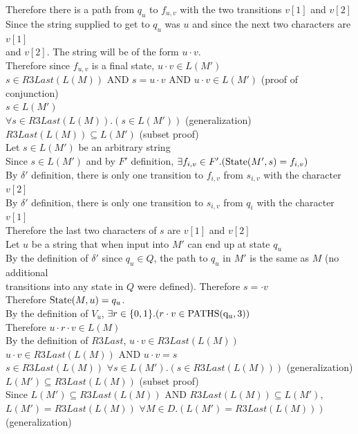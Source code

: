 \documentclass[11pt]{article}
\newcommand{\And}{\mbox{ AND }}
\begin{document}
\begin{enumerate}
\begin{solution}
\null\qquad Therefore there is a path from $q_u$ to $f_{u,v}$ with the two transitions $v[1]$ and $v[2]$\\
\null\qquad Since the string supplied to get to $q_u$ was $u$ and since the next two characters are $v[1]$\\
\null\qquad and $v[2]$. The string will be of the form $u\cdot v$.\\
\null\qquad Therefore since $f_{u,v}$ is a final state, $u\cdot v\in L(M')$\\
\null\qquad $s\in R3Last(L(M)) \And s = u\cdot v\And u\cdot v \in L(M')$ (proof of conjunction)\\
\null\qquad $s\in L(M')$\\
\null\quad $\forall s\in  R3Last(L(M)).(s\in L(M'))$ (generalization)\\
\null\quad $R3Last(L(M))\subseteq L(M')$ (subset proof)\\
\null\qquad Let $s\in L(M')$ be an arbitrary string\\
\null\qquad Since $s\in L(M')$ and by $F'$ definition, $\exists f_{i,v}\in F'.({\rm State}(M', s) = f_{i,v})$\\
\null\qquad By $\delta'$ definition, there is only one transition to $f_{i,v}$ from $s_{i,v}$ with the character $v[2]$\\
\null\qquad By $\delta'$ definition, there is only one transition to $s_{i,v}$ from $q_{i}$ with the character $v[1]$\\
\null\qquad Therefore the last two characters of $s$ are $v[1]$ and $v[2]$\\
\null\qquad Let $u$ be a string that when input into $M'$ can end up at state $q_u$\\
\null\qquad By the definition of $\delta'$ since $q_u\in Q$, the path to $q_u$ in $M'$ is the same as $M$ (no additional \\
\null\qquad transitions into any state in $Q$ were defined). Therefore $s = \cdot v$\\
\null\qquad Therefore ${\rm State}(M, u) = q_u$.\\
\null\qquad By the definition of $V_u$, $\exists r\in \{0,1\}.(r\cdot v\in {\rm PATHS(q_u, 3)})$\\
\null\qquad Therefore $u\cdot r \cdot v \in L(M)$\\
\null\qquad By the definition of $R3Last$, $u\cdot v\in R3Last(L(M))$\\
\null\qquad $u\cdot v \in R3Last(L(M)) \And u\cdot v = s$\\
\null\qquad $s\in R3Last(L(M))$
\null\quad $\forall s\in L(M'). (s\in R3Last(L(M)))$ (generalization)\\
\null\quad $L(M')\subseteq R3Last(L(M))$ (subset proof)\\
\null\quad Since $L(M')\subseteq R3Last(L(M))\And R3Last(L(M))\subseteq L(M')$, $L(M') = R3Last(L(M))$
$\forall M\in D.(L(M') = R3Last(L(M)))$ (generalization)\\
\end{solution}


\end{enumerate}
\end{document}
